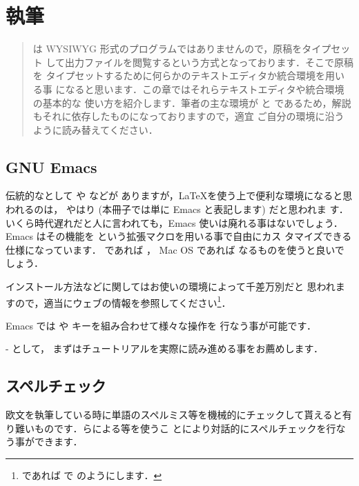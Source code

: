 \chapter{執筆}

\begin{abstract}
\laTEX は WYSIWYG 形式のプログラムではありませんので，原稿をタイプセット
して出力ファイルを閲覧するという方式となっております．そこで原稿を
タイプセットするために何らかのテキストエディタか統合環境を用いる事
になると思います．この章ではそれらテキストエディタや統合環境の基本的な
使い方を紹介します．筆者の主な環境が  と 
であるため，解説もそれに依存したものになっておりますので，適宜
ご自分の環境に沿うように読み替えてください．
\end{abstract}

\section{GNU Emacs}

伝統的なとして  や  などが
ありますが，\LaTeX を使う上で便利な環境になると思われるのは，
やはり  (本冊子では単に Emacs と表記します) だと思われま
す．いくら時代遅れだと人に言われても，Emacs 使いは廃れる事はないでしょう．
Emacs はその機能を  という拡張マクロを用いる事で自由にカス
タマイズできる仕様になっています． であれば ，
Mac OS であれば  なるものを使うと良いでしょう．

インストール方法などに関してはお使いの環境によって千差万別だと
思われますので，適当にウェブの情報を参照してください\footnote{%
 であれば で
のようにします．}．

Emacs では  や  キーを組み合わせて様々な操作を
行なう事が可能です．

-  として，
まずはチュートリアルを実際に読み進める事をお薦めします．

\section{スペルチェック}

欧文を執筆している時に単語のスペルミス等を機械的にチェックして貰えると有
り難いものです．らによる等を使うこ
とにより対話的にスペルチェックを行なう事ができます．

